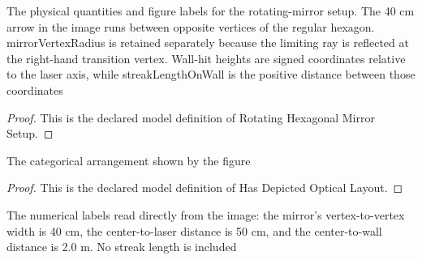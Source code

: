 \begin{definition}
  \label{def:physics:phyx-mini-0062:phyxminiproblems-problemphyxmini0062-rotatinghexagonalmirrorsetup}
  The physical quantities and figure labels for the rotating-mirror setup. The 40 cm arrow in the image runs between opposite vertices of the regular hexagon. mirrorVertexRadius is retained separately because the limiting ray is reflected at the right-hand transition vertex. Wall-hit heights are signed coordinates relative to the laser axis, while streakLengthOnWall is the positive distance between those coordinates
\end{definition}
\begin{proof}
  This is the declared model definition of Rotating Hexagonal Mirror Setup.
\end{proof}
\begin{definition}
  \label{def:physics:phyx-mini-0062:phyxminiproblems-problemphyxmini0062-hasdepictedopticallayout}
  The categorical arrangement shown by the figure
\end{definition}
\begin{proof}
  This is the declared model definition of Has Depicted Optical Layout.
\end{proof}
\begin{definition}
  \label{def:physics:phyx-mini-0062:phyxminiproblems-problemphyxmini0062-matchesfigurereadouts}
  The numerical labels read directly from the image: the mirror's vertex-to-vertex width is 40 cm, the center-to-laser distance is 50 cm, and the center-to-wall distance is 2.0 m. No streak length is included
\end{definition}
